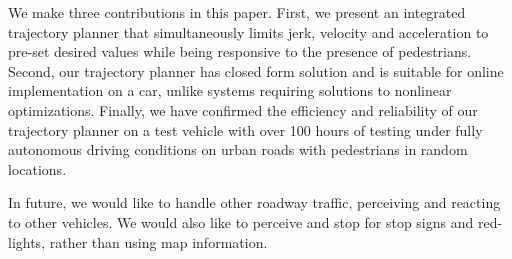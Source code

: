 \documentclass[letterpaper, 10 pt, conference]{ieeeconf}  %
\begin{document}
We make three contributions in this paper. First, we present an integrated trajectory planner that
simultaneously limits jerk, velocity and acceleration to pre-set desired values while being responsive 
to the presence of pedestrians.
Second, our trajectory planner has closed form solution and is suitable for online implementation
on a car, unlike systems requiring solutions to nonlinear optimizations. Finally, we have confirmed the
efficiency and reliability of our trajectory planner on a test vehicle with over 100 hours of testing
under fully autonomous driving conditions on urban roads with pedestrians in random locations. 

In future, we would like to handle other roadway traffic, perceiving and reacting to other vehicles. We would also like to perceive and stop for stop signs and red-lights,
rather than using map information.





\end{document}
